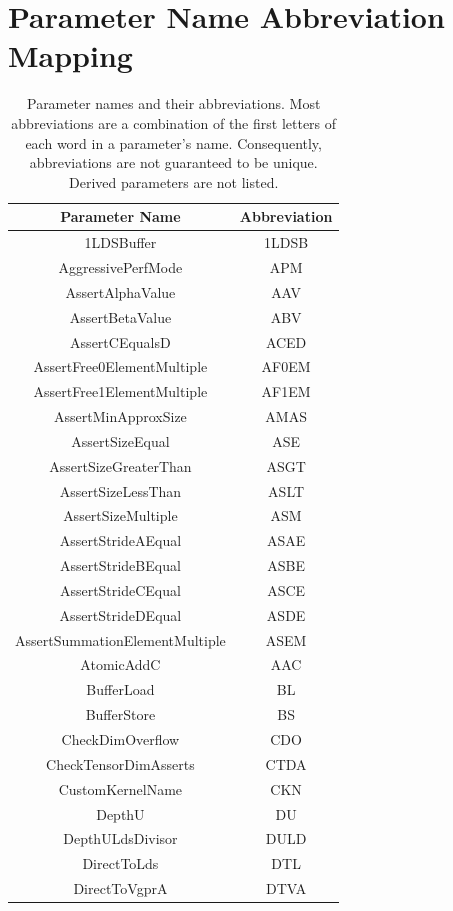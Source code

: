 \documentclass[]{article}
\begin{document}
\section{Parameter Name Abbreviation Mapping}
\begin{center}
\begin{small}
\begin{longtable}{ |c|c| } 
\caption{Parameter names and their abbreviations. Most abbreviations are a combination of the first letters of each word in a parameter's name. Consequently, abbreviations are not guaranteed to be unique. Derived parameters are not listed. }
\label{tab:ParameterAbbrMap} \\
 \hline
 \textbf{Parameter Name} & \textbf{Abbreviation} \\
 \hline
 1LDSBuffer & 1LDSB \\
 AggressivePerfMode & APM \\
 AssertAlphaValue & AAV \\
 AssertBetaValue & ABV \\
 AssertCEqualsD & ACED \\
 AssertFree0ElementMultiple & AF0EM \\
 AssertFree1ElementMultiple & AF1EM \\
 AssertMinApproxSize & AMAS \\
 AssertSizeEqual & ASE \\
 AssertSizeGreaterThan & ASGT \\
 AssertSizeLessThan & ASLT \\
 AssertSizeMultiple & ASM \\
 AssertStrideAEqual & ASAE \\
 AssertStrideBEqual & ASBE \\
 AssertStrideCEqual & ASCE \\
 AssertStrideDEqual & ASDE \\
 AssertSummationElementMultiple & ASEM \\
 AtomicAddC & AAC \\
 BufferLoad & BL \\
 BufferStore & BS \\
 CheckDimOverflow & CDO \\
 CheckTensorDimAsserts & CTDA \\
 CustomKernelName & CKN \\
 DepthU & DU \\
 DepthULdsDivisor & DULD \\
 DirectToLds & DTL \\
 DirectToVgprA & DTVA \\

\end{longtable}
\end{small}
\end{center}
\end{document}
